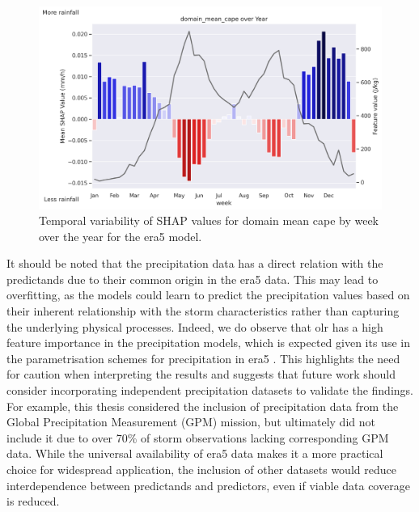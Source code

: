 \begin{figure}[ht]
    \centering
    \includegraphics[width=\textwidth]{../figures/generated/experiments/obs_precipitation/temporal_corr/obs_precipitation_era5_shap_domain_mean_cape_by_week_over_year.png}
    \caption{Temporal variability of SHAP values for domain mean \acrshort{cape} by week over the year for the \acrshort{era5} model.}
    \label{fig:obs_precipitation_era5_shap_domain_mean_cape_by_week_over_year}
\end{figure}

It should be noted that the precipitation data has a direct relation with the predictands due to their common origin in the \acrshort{era5} data. This may lead to overfitting, as the models could learn to predict the precipitation values based on their inherent relationship with the storm characteristics rather than capturing the underlying physical processes. Indeed, we do observe that \acrshort{olr} has a high feature importance in the precipitation models, which is expected given its use in the parametrisation schemes for precipitation in \acrshort{era5} \citep{Hersbach2020}. This highlights the need for caution when interpreting the results and suggests that future work should consider incorporating independent precipitation datasets to validate the findings. For example, this thesis considered the inclusion of precipitation data from the Global Precipitation Measurement (GPM) mission, but ultimately did not include it due to over 70\% of storm observations lacking corresponding GPM data. While the universal availability of \acrshort{era5} data makes it a more practical choice for widespread application, the inclusion of other datasets would reduce interdependence between predictands and predictors, even if viable data coverage is reduced.